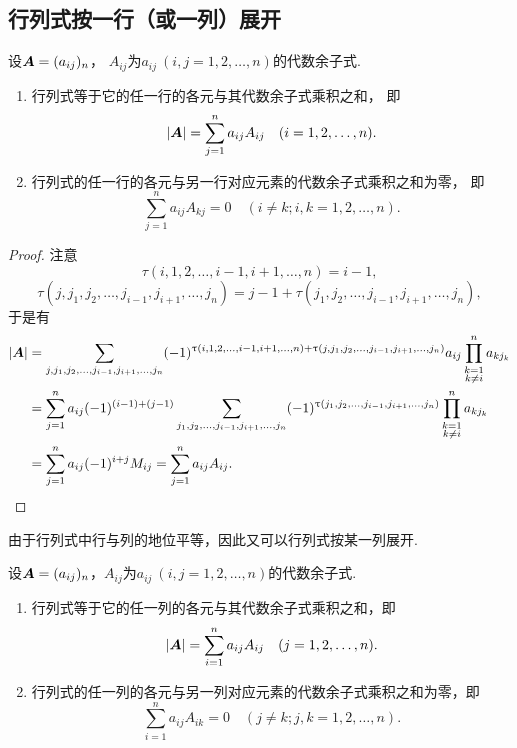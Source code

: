 \subsection{行列式按一行（或一列）展开}
\begin{theorem}
设\(\boldsymbol{A}=(a_{ij})_n\)，
\(A_{ij}\)为\(a_{ij}\ (i,j=1,2,\dotsc,n)\)的代数余子式.
\begin{enumerate}
	\item 行列式等于它的任一行的各元与其代数余子式乘积之和，
	即\begin{equation}
		\abs{\boldsymbol{A}} = \sum\limits_{j=1}^n a_{ij} A_{ij}
		\quad(i=1,2,\dotsc,n).
	\end{equation}

	\item 行列式的任一行的各元与另一行对应元素的代数余子式乘积之和为零，
	即\begin{equation}
		\sum\limits_{j=1}^n a_{ij} A_{kj} = 0
		\quad(i \neq k;
		i,k=1,2,\dotsc,n).
	\end{equation}
\end{enumerate}
\begin{proof}
注意\[
	\tau(i,1,2,\dotsc,i-1,i+1,\dotsc,n) = i-1,
\]\[
	\tau(j,j_1,j_2,\dotsc,j_{i-1},j_{i+1},\dotsc,j_n)
	= j-1+\tau(j_1,j_2,\dotsc,j_{i-1},j_{i+1},\dotsc,j_n),
\]于是有\begin{align*}
	\abs{\boldsymbol{A}}
	&= \sum\limits_{j,j_1,j_2,\dotsc,j_{i-1},j_{i+1},\dotsc,j_n}
		(-1)^{\uptau(i,1,2,\dotsc,i-1,i+1,\dotsc,n) + \uptau(j,j_1,j_2,\dotsc,j_{i-1},j_{i+1},\dotsc,j_n)}
		a_{ij} \prod\limits_{\substack{k=1 \\ k \neq i}}^n a_{k j_k} \\
	&= \sum\limits_{j=1}^n a_{ij} (-1)^{(i-1)+(j-1)}
		\sum\limits_{j_1,j_2,\dotsc,j_{i-1},j_{i+1},\dotsc,j_n}
			(-1)^{\uptau(j_1,j_2,\dotsc,j_{i-1},j_{i+1},\dotsc,j_n)}
				\prod\limits_{\substack{k=1 \\ k \neq i}}^n a_{k j_k} \\
	&= \sum\limits_{j=1}^n a_{ij} (-1)^{i+j} M_{ij}
	= \sum\limits_{j=1}^n a_{ij} A_{ij}.
	\qedhere
\end{align*}
\end{proof}
\end{theorem}

由于行列式中行与列的地位平等，因此又可以行列式按某一列展开.
\begin{theorem}
设\(\boldsymbol{A}=(a_{ij})_n\)，\(A_{ij}\)为\(a_{ij}\ (i,j=1,2,\dotsc,n)\)的代数余子式.
\begin{enumerate}
	\item 行列式等于它的任一列的各元与其代数余子式乘积之和，即\begin{equation}
		\abs{\boldsymbol{A}} = \sum\limits_{i=1}^n a_{ij} A_{ij}
		\quad(j=1,2,\dotsc,n).
	\end{equation}

	\item 行列式的任一列的各元与另一列对应元素的代数余子式乘积之和为零，即\begin{equation}
		\sum\limits_{i=1}^n a_{ij} A_{ik} = 0
		\quad(j \neq k;
		j,k=1,2,\dotsc,n).
	\end{equation}
\end{enumerate}
\end{theorem}


